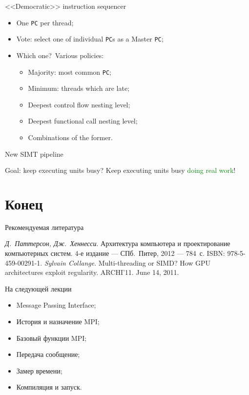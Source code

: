 \begin{frame}{<<Democratic>> instruction sequencer}
\begin{itemize}
    \item One \texttt{PC} per thread;\pause
    \item Vote: select one of individual \texttt{PC}s as a Master \texttt{PC};\pause
    \item Which one?\pause~Various policies:
    \begin{itemize}
        \item Majority: most common \texttt{PC};
        \item Minimum: threads which are late;
        \item Deepest control flow  nesting level;
        \item Deepest functional call nesting level;
        \item Combinations of the former.
    \end{itemize}
\end{itemize}
\end{frame}

\begin{frame}{New SIMT pipeline}
\centering
{}
\end{frame}

\begin{frame}
Goal: keep executing units busy?
\pause\vfill
Keep executing units busy \textcolor{green}{doing real work}!
\end{frame}

\section*{Конец}

\begin{frame}{Рекомендуемая литература}
\begin{thebibliography}{99}
    \bibitem{} \textit{Д.~Паттерсон, Дж.~Хеннесси}. Архитектура компьютера и
    проектирование компьютерных систем. 4-е издание --- СПб.~Питер, 2012 ---
    784~с. ISBN: 978-5-459-00291-1.
    \bibitem{} \textit{Sylvain Collange}. Multi-threading or SIMD? How GPU
    architectures exploit regularity. ARCHI'11. June 14, 2011.
    \end{thebibliography}
\end{frame}

\begin{frame}{На следующей лекции}
\begin{itemize}
\ifsbertech
    \item Message Passing Interface;
    \item История и назначение MPI;
    \item Базовый функции MPI;
    \item Передача сообщение;
    \item Замер времени;
    \item Компиляция и запуск.
\fi
\end{itemize}
\end{frame}

